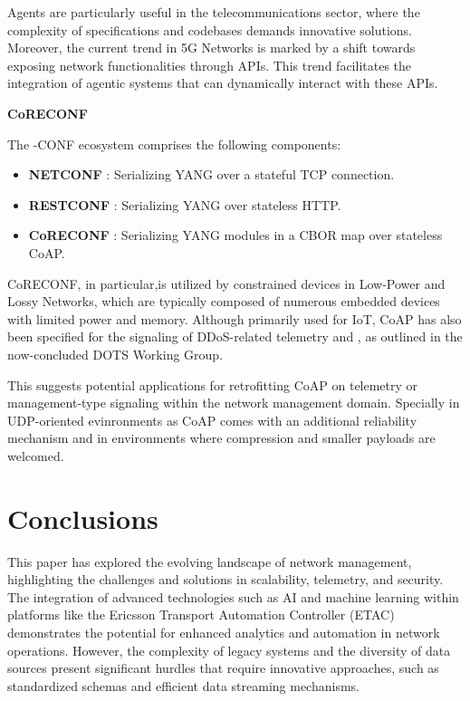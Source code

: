 \documentclass[10pt,sigconf]{iabart}
\begin{document}
Agents are particularly useful in the telecommunications sector, where the complexity of specifications and codebases demands innovative solutions. Moreover, the current trend in 5G Networks is marked by a shift towards exposing network functionalities through APIs. This trend facilitates the integration of agentic systems that can dynamically interact with these APIs.

\textbf{CoRECONF}

The -CONF ecosystem comprises the following components:
\begin{itemize}
  \item \textbf{NETCONF} \cite{RFC6241}: Serializing YANG over a stateful TCP connection.    
  \item \textbf{RESTCONF} \cite{RFC8040}: Serializing YANG over stateless HTTP.
  \item \textbf{CoRECONF} \cite{draft-ietf-core-comi}: Serializing YANG modules in a CBOR \cite{RFC9254} map over stateless CoAP.
\end{itemize}

CoRECONF, in particular,is utilized by constrained devices in Low-Power and Lossy Networks, which are typically composed of numerous embedded devices with limited power and memory. Although primarily used for IoT, CoAP has also been specified for the signaling of DDoS-related telemetry \cite{RFC9132} and \cite{RFC9362}, as outlined in the now-concluded DOTS Working Group. 

This suggests potential applications for retrofitting CoAP on telemetry or management-type signaling within the network management domain. Specially in UDP-oriented evinronments as CoAP comes with an additional reliability mechanism and in environments where compression and smaller payloads are welcomed. 

\section{Conclusions} \label{conclusions}

This paper has explored the evolving landscape of network management, highlighting the challenges and solutions in scalability, telemetry, and security. The integration of advanced technologies such as AI and machine learning within platforms like the Ericsson Transport Automation Controller (ETAC) demonstrates the potential for enhanced analytics and automation in network operations. However, the complexity of legacy systems and the diversity of data sources present significant hurdles that require innovative approaches, such as standardized schemas and efficient data streaming mechanisms.
\end{document}
